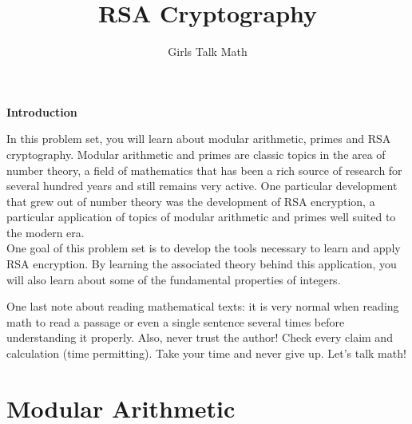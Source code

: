 \documentclass[12 pt]{article}
\title{RSA Cryptography}
\author{Girls Talk Math}
\date{}
\newcounter{exercise}[section]
\begin{document}
\maketitle
\vskip 1in
\begin{center} \textbf{Introduction} \end{center}

\indent In this problem set, you will learn about modular arithmetic, primes and RSA cryptography. Modular arithmetic and primes are classic topics in the area of number theory, a field of mathematics that has been a rich source of research for several hundred years and still remains very active. One particular development that grew out of number theory was the development of RSA encryption, a particular application of topics of modular arithmetic and primes well suited to the modern era.\\
    
    One goal of this problem set is to develop the tools necessary to learn and apply RSA encryption. By learning the associated theory behind this application, you will also learn about some of the fundamental properties of integers.
    
    One last note about reading mathematical texts: it is very normal when reading math to read a passage or even a single sentence several times before understanding it properly. Also, never trust the author! Check every claim and calculation (time permitting). Take your time and never give up. Let's talk math!
	
\newpage

\tableofcontents



\newpage


\section{Modular Arithmetic}
\end{document}
